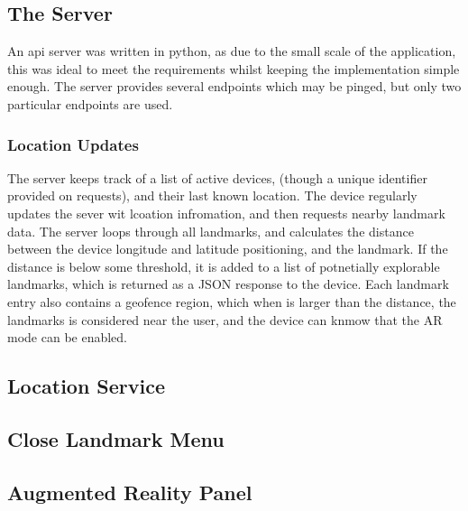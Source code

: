 \subsection{The Server}
An api server was written in python, as due to the small scale of the application, this was ideal to meet the requirements whilst keeping the 
implementation simple enough. The server provides several endpoints which may be pinged, but only two particular endpoints are used. 
\subsubsection{Location Updates}
The server keeps track of a list of active devices, (though a unique identifier provided on requests), and their last known location.
The device regularly updates the sever wit lcoation infromation, and then requests nearby landmark data. 
The server loops through all landmarks, and calculates the distance between the device longitude and latitude positioning, and the landmark.
If the distance is below some threshold, it is added to a list of potnetially explorable landmarks, which is returned as a JSON response 
to the device. Each landmark entry also contains a geofence region, which when is larger than the distance, the landmarks is considered near 
the user, and the device can knmow that the AR mode can be enabled.
\subsection{Location Service}
\subsection{Close Landmark Menu}
\subsection{Augmented Reality Panel}